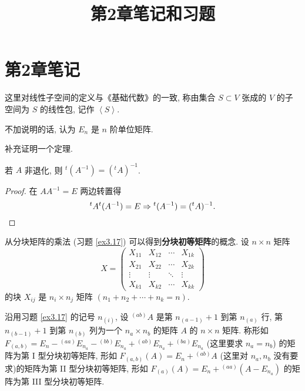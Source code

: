 \documentclass{ctexart}
\title{第2章笔记和习题}
\begin{document}
\maketitle
\section{第2章笔记}
这里对线性子空间的定义与《基础代数》的一致, 称由集合 $S\subset V$ 张成的 $V$ 的子空间为 $S$ 的线性包, 记作 $\left<S\right>$.

不加说明的话, 认为 $E_n$ 是 $n$ 阶单位矩阵.

补充证明一个定理.
\begin{theorem}
    若 $A$ 非退化, 则 ${}^t(A^{-1})=({}^tA)^{-1}$.
\end{theorem}
\begin{proof}
    在 $AA^{-1}=E$ 两边转置得
    \[{}^tA{}^t(A^{-1})=E\Rightarrow{}^t(A^{-1})=({}^tA)^{-1}.\qedhere\]
\end{proof}

从分块矩阵的乘法 (习题 \ref{ex3.17}) 可以得到\textbf{分块初等矩阵}的概念. 设 $n\times n$ 矩阵
\[X=\begin{pmatrix}
    X_{11} & X_{12} & \cdots & X_{1k} \\
    X_{21} & X_{22} & \cdots & X_{2k} \\
    \vdots & \vdots & \ddots & \vdots \\
    X_{k1} & X_{k2} & \cdots & X_{kk}
\end{pmatrix}\]
的块 $X_{ij}$ 是 $n_i\times n_j$ 矩阵 $(n_1+n_2+\cdots+n_k=n)$.
\begin{definition}
    沿用习题 \ref{ex3.17} 的记号 $n_{(i)}$, 设 ${}^{(ab)}A$ 是第 $n_{(a-1)}+1$ 到第 $n_{(a)}$ 行, 第 $n_{(b-1)}+1$ 到第 $n_{(b)}$ 列为一个 $n_a\times n_b$ 的矩阵 $A$ 的 $n\times n$ 矩阵. 称形如 $F_{(a,b)}=E_n-{}^{(aa)}E_{n_a}-{}^{(bb)}E_{n_a}+{}^{(ab)}E_{n_a}+{}^{(ba)}E_{n_a}$ (这里要求 $n_a=n_b$) 的矩阵为第 I 型分块初等矩阵, 形如 $F_{(a,b)}(A)=E_n+{}^{(ab)}A$ (这里对 $n_a,n_b$ 没有要求)的矩阵为第 II 型分块初等矩阵, 形如 $F_{(a)}(A)=E_n+{}^{(aa)}(A-E_{n_a})$ 的矩阵为第 III 型分块初等矩阵.
\end{definition}
\end{document}
